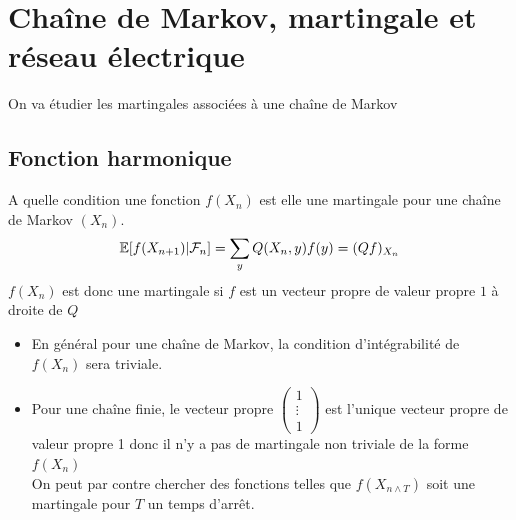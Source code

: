 \documentclass[]{report}
\begin{document}
    \chapter{Chaîne de Markov, martingale et réseau électrique}

    On va étudier les martingales associées à une chaîne de Markov

    \section{Fonction harmonique}

    A quelle condition une fonction $f(X_n)$ est elle une martingale pour une chaîne de Markov $(X_n)$.
    \[\mathbb{E}[f(X_{n+1})|\mathcal{F}_n]=\sum_y Q(X_n,y)f(y)=(Qf)_{X_n}\]
    $f(X_n)$ est donc une martingale si $f$ est un vecteur propre de valeur propre $1$ à droite de $Q$

    \begin{re}{}{}
        \begin{itemize}
            \item En général pour une chaîne de Markov, la condition d'intégrabilité de $f(X_n)$ sera triviale.
            \item Pour une chaîne finie, le vecteur propre $\left(\begin{matrix}
            1\\
            \vdots\\
            1
        \end{matrix}\right)$ est l'unique vecteur propre de valeur propre 1 donc il n'y a pas de martingale non triviale de la forme $f(X_n)$\\
        On peut par contre chercher des fonctions telles que $f(X_{n\wedge T})$ soit une martingale pour $T$ un temps d'arrêt. 
        \end{itemize}
    \end{re}
\end{document}
